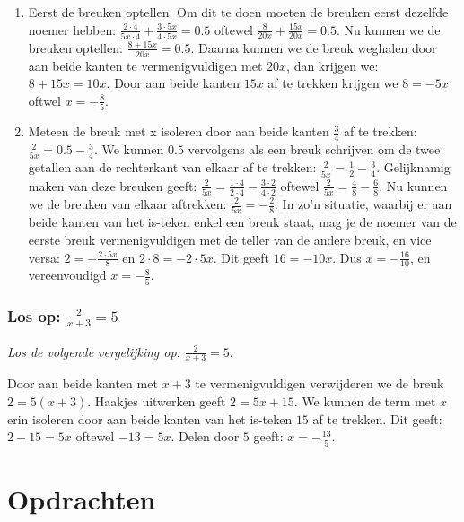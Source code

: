 \documentclass[
  a4paper,
]{scrbook}
\theoremstyle{definition}
\theoremstyle{remark}
\begin{document}
\begin{enumerate}
\def\labelenumi{\arabic{enumi}.}
\item
  Eerst de breuken optellen. Om dit te doen moeten de breuken eerst
  dezelfde noemer hebben:
  \(\frac{2\cdot4}{5x\cdot4} + \frac{3\cdot5x}{4\cdot5x} = 0.5\) oftewel
  \(\frac{8}{20x} + \frac{15x}{20x} = 0.5\). Nu kunnen we de breuken
  optellen: \(\frac{8+15x}{20x} = 0.5\). Daarna kunnen we de breuk
  weghalen door aan beide kanten te vermenigvuldigen met \(20x\), dan
  krijgen we: \(8+15x = 10x\). Door aan beide kanten \(15x\) af te
  trekken krijgen we \(8 = -5x\) oftwel \(x = -\frac{8}{5}\).
\item
  Meteen de breuk met x isoleren door aan beide kanten \(\frac{3}{4}\)
  af te trekken: \(\frac{2}{5x} = 0.5-\frac{3}{4}\). We kunnen \(0.5\)
  vervolgens als een breuk schrijven om de twee getallen aan de
  rechterkant van elkaar af te trekken:
  \(\frac{2}{5x} = \frac{1}{2}-\frac{3}{4}\). Gelijknamig maken van deze
  breuken geeft:
  \(\frac{2}{5x} = \frac{1\cdot4}{2\cdot4}-\frac{3\cdot2}{4\cdot2}\)
  oftewel \(\frac{2}{5x} = \frac{4}{8}-\frac{6}{8}\). Nu kunnen we de
  breuken van elkaar aftrekken: \(\frac{2}{5x} = -\frac{2}{8}\). In zo'n
  situatie, waarbij er aan beide kanten van het is-teken enkel een breuk
  staat, mag je de noemer van de eerste breuk vermenigvuldigen met de
  teller van de andere breuk, en vice versa: \(2 = -\frac{2\cdot5x}{8}\)
  en \(2\cdot8 = -2\cdot5x\). Dit geeft \(16 = - 10x\). Dus
  \(x = -\frac{16}{10}\), en vereenvoudigd \(x = -\frac{8}{5}\).
\end{enumerate}

\subsubsection{\texorpdfstring{Los op:
\(\frac{2}{x+3}=5\)}{Los op: \textbackslash frac\{2\}\{x+3\}=5}}

\emph{Los de volgende vergelijking op:} \(\frac{2}{x+3}=5\).

Door aan beide kanten met \(x+3\) te vermenigvuldigen verwijderen we de
breuk \(2 = 5(x+3)\). Haakjes uitwerken geeft \(2 = 5x + 15\). We kunnen
de term met \(x\) erin isoleren door aan beide kanten van het is-teken
\(15\) af te trekken. Dit geeft: \(2-15 = 5x\) oftewel \(-13 = 5x\).
Delen door \(5\) geeft: \(x = -\frac{13}{5}\).

\section{Opdrachten}\label{opdrachten-1}
\end{document}
